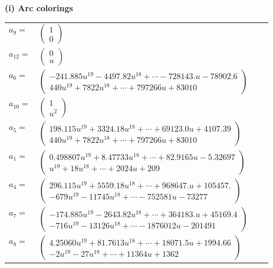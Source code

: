 \documentclass[1p]{elsarticle_modified}
\theoremstyle{definition}
\begin{document}
\flushleft \textbf{(i) Arc colorings}\\
\begin{tabular}{m{7pt} m{180pt} m{7pt} m{180pt} }
\flushright $a_{9}=$&$\begin{pmatrix}1\\0\end{pmatrix}$ \\
\flushright $a_{12}=$&$\begin{pmatrix}0\\u\end{pmatrix}$ \\
\flushright $a_{6}=$&$\begin{pmatrix}-241.885 u^{19}-4497.82 u^{18}+\cdots-728143. u-78902.6\\440 u^{19}+7822 u^{18}+\cdots+797266 u+83010\end{pmatrix}$ \\
\flushright $a_{10}=$&$\begin{pmatrix}1\\u^2\end{pmatrix}$ \\
\flushright $a_{5}=$&$\begin{pmatrix}198.115 u^{19}+3324.18 u^{18}+\cdots+69123.0 u+4107.39\\440 u^{19}+7822 u^{18}+\cdots+797266 u+83010\end{pmatrix}$ \\
\flushright $a_{1}=$&$\begin{pmatrix}0.498807 u^{19}+8.47733 u^{18}+\cdots+82.9165 u-5.32697\\u^{19}+18 u^{18}+\cdots+2024 u+209\end{pmatrix}$ \\
\flushright $a_{4}=$&$\begin{pmatrix}296.115 u^{19}+5559.18 u^{18}+\cdots+968647. u+105457.\\-679 u^{19}-11745 u^{18}+\cdots-752581 u-73277\end{pmatrix}$ \\
\flushright $a_{7}=$&$\begin{pmatrix}-174.885 u^{19}-2643.82 u^{18}+\cdots+364183. u+45169.4\\-716 u^{19}-13126 u^{18}+\cdots-1876012 u-201491\end{pmatrix}$ \\
\flushright $a_{8}=$&$\begin{pmatrix}4.25060 u^{19}+81.7613 u^{18}+\cdots+18071.5 u+1994.66\\-2 u^{19}-27 u^{18}+\cdots+11364 u+1362\end{pmatrix}$ \\

\end{tabular}
\end{document}
